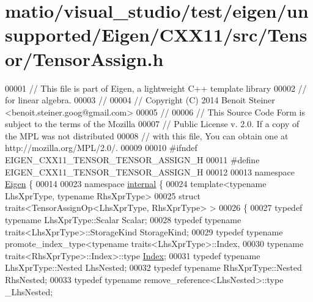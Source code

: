 \hypertarget{matio_2visual__studio_2test_2eigen_2unsupported_2_eigen_2_c_x_x11_2src_2_tensor_2_tensor_assign_8h_source}{}\section{matio/visual\+\_\+studio/test/eigen/unsupported/\+Eigen/\+C\+X\+X11/src/\+Tensor/\+Tensor\+Assign.h}
\label{matio_2visual__studio_2test_2eigen_2unsupported_2_eigen_2_c_x_x11_2src_2_tensor_2_tensor_assign_8h_source}

\begin{DoxyCode}
00001 \textcolor{comment}{// This file is part of Eigen, a lightweight C++ template library}
00002 \textcolor{comment}{// for linear algebra.}
00003 \textcolor{comment}{//}
00004 \textcolor{comment}{// Copyright (C) 2014 Benoit Steiner <benoit.steiner.goog@gmail.com>}
00005 \textcolor{comment}{//}
00006 \textcolor{comment}{// This Source Code Form is subject to the terms of the Mozilla}
00007 \textcolor{comment}{// Public License v. 2.0. If a copy of the MPL was not distributed}
00008 \textcolor{comment}{// with this file, You can obtain one at http://mozilla.org/MPL/2.0/.}
00009 
00010 \textcolor{preprocessor}{#ifndef EIGEN\_CXX11\_TENSOR\_TENSOR\_ASSIGN\_H}
00011 \textcolor{preprocessor}{#define EIGEN\_CXX11\_TENSOR\_TENSOR\_ASSIGN\_H}
00012 
00013 \textcolor{keyword}{namespace }\hyperlink{namespace_eigen}{Eigen} \{
00014 
00023 \textcolor{keyword}{namespace }\hyperlink{namespaceinternal}{internal} \{
00024 \textcolor{keyword}{template}<\textcolor{keyword}{typename} LhsXprType, \textcolor{keyword}{typename} RhsXprType>
00025 \textcolor{keyword}{struct }traits<TensorAssignOp<LhsXprType, RhsXprType> >
00026 \{
00027   \textcolor{keyword}{typedef} \textcolor{keyword}{typename} LhsXprType::Scalar Scalar;
00028   \textcolor{keyword}{typedef} \textcolor{keyword}{typename} traits<LhsXprType>::StorageKind StorageKind;
00029   \textcolor{keyword}{typedef} \textcolor{keyword}{typename} promote\_index\_type<typename traits<LhsXprType>::Index,
00030                                       \textcolor{keyword}{typename} traits<RhsXprType>::Index>::type 
      \hyperlink{namespace_eigen_a62e77e0933482dafde8fe197d9a2cfde}{Index};
00031   \textcolor{keyword}{typedef} \textcolor{keyword}{typename} LhsXprType::Nested LhsNested;
00032   \textcolor{keyword}{typedef} \textcolor{keyword}{typename} RhsXprType::Nested RhsNested;
00033   \textcolor{keyword}{typedef} \textcolor{keyword}{typename} remove\_reference<LhsNested>::type \_LhsNested;

\end{DoxyCode}

